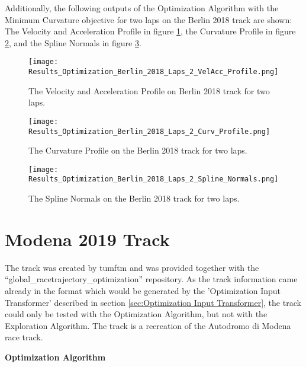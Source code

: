 Additionally, the following outputs of the Optimization Algorithm with the Minimum Curvature objective for two laps on the Berlin 2018 track are shown: The Velocity and Acceleration Profile in figure \ref{fig:Results Berlin 2018 Laps 2 VelAcc Profile}, the Curvature Profile in figure \ref{fig:Results Berlin 2018 Laps 2 Curv Profile}, and the Spline Normals in figure \ref{fig:Results Berlin 2018 Laps 2 Spline Normals}.
\begin{figure}[H]
    \centering
    \texttt{[image: Results\_Optimization\_Berlin\_2018\_Laps\_2\_VelAcc\_Profile.png]}
    \caption{The Velocity and Acceleration Profile on Berlin 2018 track for two laps.}
    \label{fig:Results Berlin 2018 Laps 2 VelAcc Profile}
\end{figure}
\begin{figure}[H]
    \centering
    \texttt{[image: Results\_Optimization\_Berlin\_2018\_Laps\_2\_Curv\_Profile.png]}
    \caption{The Curvature Profile on the Berlin 2018 track for two laps.}
    \label{fig:Results Berlin 2018 Laps 2 Curv Profile}
\end{figure}
\begin{figure}[H]
    \centering
    \texttt{[image: Results\_Optimization\_Berlin\_2018\_Laps\_2\_Spline\_Normals.png]}
    \caption{The Spline Normals on the Berlin 2018 track for two laps.}
    \label{fig:Results Berlin 2018 Laps 2 Spline Normals}
\end{figure}

\pagebreak

\section{Modena 2019 Track} \label{sec:Results Modena 2019 Track}
The track was created by \acrshort{tumftm} and was provided together with the ``global\_racetrajectory\_optimization'' repository. \cite{tumftm_optimization_algoritm}
As the track information came already in the format which would be generated by the 'Optimization Input Transformer' described in section \ref{sec:Optimization Input Transformer}, the track could only be tested with the Optimization Algorithm, but not with the Exploration Algorithm. The track is a recreation of the Autodromo di Modena race track. \cite{modena_race_track}

\textbf{Optimization Algorithm}

